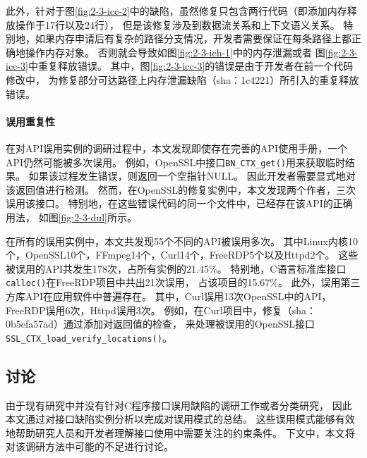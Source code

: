 此外，针对于图\ref{fig:2-3-icc-2}中的缺陷，虽然修复只包含两行代码（即添加内存释放操作于17行以及24行），
但是该修复涉及到数据流关系和上下文语义关系。
特别地，如果内存申请后有复杂的路径分支情况，开发者需要保证在每条路径上都正确地操作内存对象。
否则就会导致如图\ref{fig:2-3-ieh-1}中的内存泄漏或者
图\ref{fig:2-3-icc-3}中重复释放错误。
其中，图\ref{fig:2-3-icc-3}的错误是由于开发者在前一个代码修改中，
为修复部分可达路径上内存泄漏缺陷（sha：1c4221）所引入的重复释放错误。

\vspace*{10pt}
\begin{center}
	\noindent{}
\end{center}



\paragraph{误用重复性}
在对API误用实例的调研过程中，本文发现即使存在完善的API使用手册，一个API仍然可能被多次误用。
例如，OpenSSL中接口\texttt{BN\_CTX\_get()}用来获取临时结果。
如果该过程发生错误，则返回一个空指针NULL。
因此开发者需要显式地对该返回值进行检测。
然而，在OpenSSL的修复实例中，本文发现两个作者，三次误用该接口。
特别地，在这些错误代码的同一个文件中，已经存在该API的正确用法，
如图\ref{fig:2-3-dul}所示。

在所有的误用实例中，本文共发现55个不同的API被误用多次。
其中Linux内核10个，OpenSSL10个，FFmpeg14个，Curl14个，FreeRDP5个以及Httpd2个。
这些被误用的API共发生178次，占所有实例的21.45\%。
特别地，C语言标准库接口\texttt{calloc()}在FreeRDP项目中共出21次误用，
占该项目的15.67\%。
此外，误用第三方库API在应用软件中普遍存在。
其中，Curl误用13次OpenSSL中的API，FreeRDP误用6次，Httpd误用3次。
例如，在Curl项目中，修复（sha：0b5efa57ad）通过添加对返回值的检查，
来处理被误用的OpenSSL接口
\texttt{SSL\_CTX\_load\_verify\_locations()}。


\subsection{讨论}
由于现有研究中并没有针对C程序接口误用缺陷的调研工作或者分类研究，
因此本文通过对接口缺陷实例分析以完成对误用模式的总结。
这些误用模式能够有效地帮助研究人员和开发者理解接口使用中需要关注的约束条件。
下文中，本文将对该调研方法中可能的不足进行讨论。

